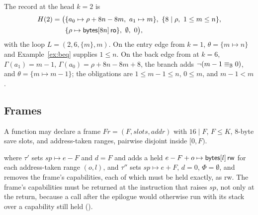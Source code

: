 \begin{example}\label{ex:tau}\label{ex:back}
The record at the head $k=2$ is
\[
\begin{aligned}H(2)=\big(&\{a_0\mapsto\rho+8n-8m,\ a_1\mapsto m\},\ \{8\mid\rho,\ 1\le m\le n\},\\ &\{\bytes{\rho}{8n}{ro}\},\ \emptyset,\ 0\big),\end{aligned}
\]
with the loop $L=(2,6,\{m\},m)$. On the entry edge from $k=1$, $\theta=\{m\mapsto n\}$ and Example~\ref{ex:beq} supplies $1\le n$. On the back edge from  at $k=6$, $\Gamma(a_1)=m-1$, $\Gamma(a_0)=\rho+8n-8m+8$, the branch adds $\lnot(m-1\equiv_{\mathbb{B}}0)$, and $\theta=\{m\mapsto m-1\}$; the obligations are $1\le m-1\le n$, $0\le m$, and $m-1<m$.
\end{example}

\subsection{Frames}
A function may declare a frame $\mathit{Fr}=(F,\mathit{slots},\mathit{addr})$ with $16\mid F$, $F\le K$, 8-byte save slots, and address-taken ranges, pairwise disjoint inside $[0,F)$.
where $\tau'$ sets $\mathit{sp}\mapsto e-F$ and $d=F$ and adds a held $e-F+o\mapsto\mathsf{bytes}[l]\,\mathsf{rw}$ for each address-taken range $(o,l)$, and $\tau''$ sets $\mathit{sp}\mapsto e+F$, $d=0$, $\Phi=\emptyset$, and removes the frame's capabilities, each of which must be held exactly, as \textsf{rw}. The frame's capabilities must be returned at the instruction that raises $\mathit{sp}$, not only at the return, because a call after the epilogue would otherwise run with its stack over a capability still held ().

